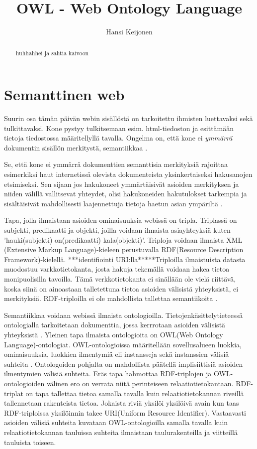\documentclass[a4paper,10pt]{article}
\title{OWL - Web Ontology Language}
\author{Hansi Keijonen}
\begin{document}
\maketitle
\newpage

\begin{abstract}
huhhahhei ja sahtia kaivoon
\end{abstract}
\newpage
\section{Semanttinen web}
Suurin osa tämän päivän webin sisällöstä on tarkoitettu ihmisten luettavaksi sekä tulkittavaksi. Kone pystyy tulkitsemaan esim. html-tiedoston ja esittämään tietoja tiedostossa määritellyllä tavalla. Ongelma on, että kone ei \textit{ymmärrä} dokumentin sisällön merkitystä, semantiikkaa \cite{BHL01}.

Se, että kone ei ymmärrä dokumenttien semanttisia merkityksiä rajoittaa esimerkiksi haut internetissä olevista dokumenteista yksinkertaiseksi hakusanojen etsimiseksi. Sen sijaan jos hakukoneet ymmärtäisivät asioiden merkityksen ja niiden välillä vallitsevat yhteydet, olisi hakukoneiden hakutulokset tarkempia ja sisältäisivät mahdollisesti laajennettuja tietoja haetun asian ympäriltä \cite{BHL01}. 

Tapa, jolla ilmaistaan asioiden ominaisuuksia webissä on tripla. Triplassä on subjekti, predikaatti ja objekti, joilla voidaan ilmaista asiayhteyksiä kuten 'hauki(subjekti) on(predikaatti) kala(objekti)'. Triploja voidaan ilmaista XML (Extensive Markup Language)-kieleen perustuvalla RDF(Resource Description Framework)-kielellä. ***identifiointi URI:lla*****Triploilla ilmaistuista datasta muodostuu varkkotietokanta, josta hakuja tekemällä voidaan hakea tietoa monipuolisilla tavoilla. Tämä verkkotietokanta ei sinällään ole vielä riittävä, koska siinä on ainoastaan talletettuna tietoa asioiden välisistä yhteyksistä, ei merkityksiä. RDF-triploilla ei ole mahdollista tallettaa semantiikoita \cite{BHL01}. 

Semantiikkaa voidaan webissä ilmaista ontologioilla. Tietojenkäsittelytieteessä ontologialla tarkoitetaan dokumenttia, jossa kerrrotaan asioiden välisistä yhteyksistä \cite{BHL01}. 
Yleinen tapa ilmaista ontologioita on OWL(Web Ontology Language)-ontologiat. OWL-ontologioissa määritellään sovellusalueen luokkia, ominaisuuksia, luokkien ilmentymiä eli instansseja  sekä instanssien välisiä suhteita \cite{SWM04}. Ontologoiden pohjalta on mahdollista päätellä implisiittisiä asioiden ilmentymien välisiä suhteita. Eräs tapa hahmottaa RDF-triplojen ja OWL-ontologioiden välinen ero on verrata niitä perinteiseen relaatiotietokantaan. RDF-triplat on tapa tallettaa tietoa samalla tavalla kuin relaatiotietokannan riveillä tallennetaan rakenteista tietoa. Jokaista riviä yksilöi yksilöivä avain kun taas RDF-triploissa yksilöinnin takee URI(Uniform Resource Identifier). Vastaavasti asioiden välisiä suhteita kuvataan OWL-ontologioilla samalla tavalla kuin relaatiotietokannan tauluissa suhteita ilmaistaan taulurakenteilla ja viitteillä tauluista toiseen. 
\end{document}
